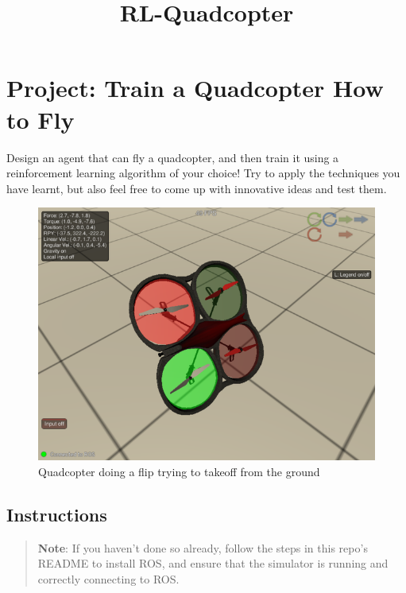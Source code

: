 \documentclass[11pt]{article}
\title{RL-Quadcopter}
\makeatletter
\def\maxwidth{\ifdim\Gin@nat@width>\linewidth\linewidth
    \else\Gin@nat@width\fi}
\let\Oldincludegraphics\includegraphics
\renewcommand{\includegraphics}[1]{\Oldincludegraphics[width=.8\maxwidth]{#1}}
\makeatother
\begin{document}
    
    
    \maketitle
    
    

    
    \hypertarget{project-train-a-quadcopter-how-to-fly}{%
\section{Project: Train a Quadcopter How to
Fly}\label{project-train-a-quadcopter-how-to-fly}}

Design an agent that can fly a quadcopter, and then train it using a
reinforcement learning algorithm of your choice! Try to apply the
techniques you have learnt, but also feel free to come up with
innovative ideas and test them.

\begin{figure}
\centering
\includegraphics{images/quadcopter_tumble.png}
\caption{Quadcopter doing a flip trying to takeoff from the ground}
\end{figure}

\hypertarget{instructions}{%
\subsection{Instructions}\label{instructions}}

\begin{quote}
\textbf{Note}: If you haven't done so already, follow the steps in this
repo's README to install ROS, and ensure that the simulator is running
and correctly connecting to ROS.
\end{quote}
\end{document}
